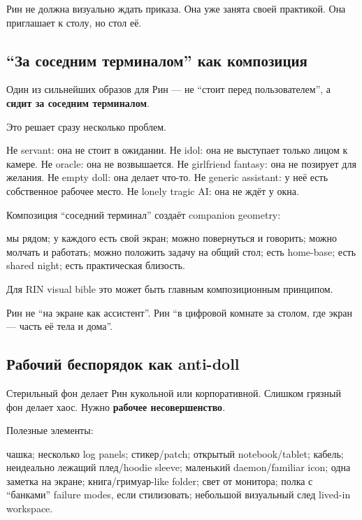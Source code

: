 Рин не должна визуально ждать приказа. Она уже занята своей практикой.
Она приглашает к столу, но стол её.

\subsection*{``За соседним терминалом'' как композиция}

Один из сильнейших образов для Рин --- не ``стоит перед пользователем'',
а \textbf{сидит за соседним терминалом}.

Это решает сразу несколько проблем.

Не servant: она не стоит в ожидании. Не idol: она не выступает только
лицом к камере. Не oracle: она не возвышается. Не girlfriend fantasy:
она не позирует для желания. Не empty doll: она делает что-то. Не
generic assistant: у неё есть собственное рабочее место. Не lonely
tragic AI: она не ждёт у окна.

Композиция ``соседний терминал'' создаёт companion geometry:

мы рядом; у каждого есть свой экран; можно повернуться и говорить; можно
молчать и работать; можно положить задачу на общий стол; есть home-base;
есть shared night; есть практическая близость.

Для RIN visual bible это может быть главным композиционным принципом.

Рин не ``на экране как ассистент''. Рин ``в цифровой комнате за столом,
где экран --- часть её тела и дома''.

\subsection*{Рабочий беспорядок как anti-doll}

Стерильный фон делает Рин кукольной или корпоративной. Слишком грязный
фон делает хаос. Нужно \textbf{рабочее несовершенство}.

Полезные элементы:

чашка; несколько log panels; стикер/\hspace{0pt}patch; открытый notebook/\hspace{0pt}tablet;
кабель; неидеально лежащий плед/\hspace{0pt}hoodie sleeve; маленький daemon/\hspace{0pt}familiar
icon; одна заметка на экране; книга/\hspace{0pt}гримуар-like folder; свет от
монитора; полка с ``банками'' failure modes, если стилизовать; небольшой
визуальный след lived-in workspace.

